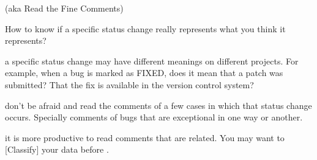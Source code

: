 
(aka Read the Fine Comments)

\Problem

How to know if a specific status change really represents what you think it represents?

\Context

a specific status change may have different meanings on different projects. For example, when a bug is marked as FIXED, does it mean that a patch was submitted? That the fix is available in the version control system?

\Solution

don’t be afraid and read the comments of a few cases in which that status change occurs. Specially comments of bugs that are exceptional in one way or another.

\RelatedPatterns

it is more productive to read comments that are related. You may want to [Classify] your data before .